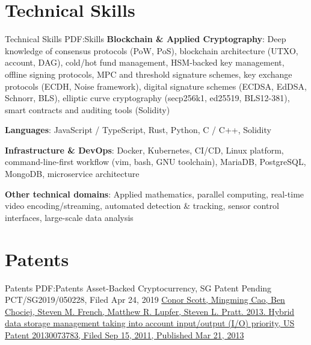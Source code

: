 \documentclass[a4paper,10pt,oneside]{article}
\begin{document}
\begin{body}
\section
{Technical Skills}
{Technical Skills}
{PDF:Skills}
\textbf{Blockchain \& Applied Cryptography}: Deep knowledge of consensus protocols (PoW, PoS), blockchain architecture (UTXO, account, DAG), cold/hot fund management, HSM-backed key management, offline signing protocols, MPC and threshold signature schemes, key exchange protocols (ECDH, Noise framework), digital signature schemes (ECDSA, EdDSA, Schnorr, BLS), elliptic curve cryptography (secp256k1, ed25519, BLS12-381), smart contracts and auditing tools (Solidity)
\par\vspace{0.25em}
\textbf{Languages}: JavaScript / TypeScript, Rust, Python, C / C++, Solidity
\par\vspace{0.25em}
\textbf{Infrastructure \& DevOps}: Docker, Kubernetes, CI/CD, Linux platform, command-line-first workflow (vim, bash, GNU toolchain), MariaDB, PostgreSQL, MongoDB, microservice architecture
\par\vspace{0.25em}
\textbf{Other technical domains}: Applied mathematics, parallel computing, real-time video encoding/streaming, automated detection \& tracking, sensor control interfaces, large-scale data analysis
\newline


\section
{Patents}
{Patents}
{PDF:Patents}
{Asset-Backed Cryptocurrency, SG Patent Pending PCT/SG2019/050228, Filed Apr 24, 2019  }
\newline
\newline
\href{https://www.google.com/patents/US20130073783}
{Conor Scott, Mingming Cao, Ben Chociej, Steven M. French, Matthew R. Lupfer, Steven L. Pratt. 2013. Hybrid data storage management taking into account input/output (I/O) priority, US Patent 20130073783, Filed Sep 15, 2011, Published Mar 21, 2013 }
\end{body}
\label{LastPage}
\end{document}
